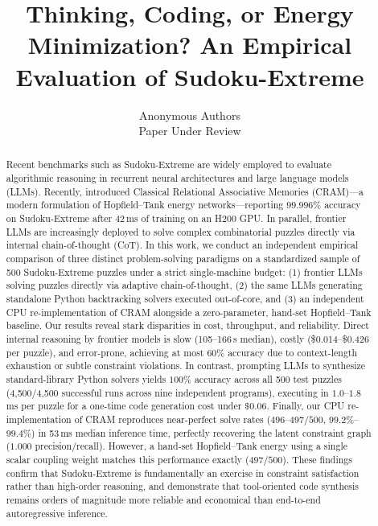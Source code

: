 \documentclass{article} %
\title{Thinking, Coding, or Energy Minimization? An Empirical Evaluation of Sudoku-Extreme}
\author{Anonymous Authors\\
Paper Under Review\\
}
\begin{document}
\maketitle

\begin{abstract}
Recent benchmarks such as Sudoku-Extreme are widely employed to evaluate algorithmic reasoning in recurrent neural architectures and large language models (LLMs). Recently, \citet{hoover2026classical} introduced Classical Relational Associative Memories (CRAM)---a modern formulation of Hopfield--Tank energy networks---reporting $99.996\%$ accuracy on Sudoku-Extreme after 42\,ms of training on an H200 GPU. In parallel, frontier LLMs are increasingly deployed to solve complex combinatorial puzzles directly via internal chain-of-thought (CoT). In this work, we conduct an independent empirical comparison of three distinct problem-solving paradigms on a standardized sample of 500 Sudoku-Extreme puzzles under a strict single-machine budget: (1) frontier LLMs solving puzzles directly via adaptive chain-of-thought, (2) the same LLMs generating standalone Python backtracking solvers executed out-of-core, and (3) an independent CPU re-implementation of CRAM alongside a zero-parameter, hand-set Hopfield--Tank baseline. Our results reveal stark disparities in cost, throughput, and reliability. Direct internal reasoning by frontier models is slow (105--166\,s median), costly (\$0.014--\$0.426 per puzzle), and error-prone, achieving at most $60\%$ accuracy due to context-length exhaustion or subtle constraint violations. In contrast, prompting LLMs to synthesize standard-library Python solvers yields $100\%$ accuracy across all 500 test puzzles (4,500/4,500 successful runs across nine independent programs), executing in $1.0$--$1.8$\,ms per puzzle for a one-time code generation cost under $\$0.06$. Finally, our CPU re-implementation of CRAM reproduces near-perfect solve rates ($496$--$497/500$, $99.2\%$--$99.4\%$) in 53\,ms median inference time, perfectly recovering the latent constraint graph ($1.000$ precision/recall). However, a hand-set Hopfield--Tank energy using a single scalar coupling weight matches this performance exactly ($497/500$). These findings confirm that Sudoku-Extreme is fundamentally an exercise in constraint satisfaction rather than high-order reasoning, and demonstrate that tool-oriented code synthesis remains orders of magnitude more reliable and economical than end-to-end autoregressive inference.
\end{abstract}
\end{document}
